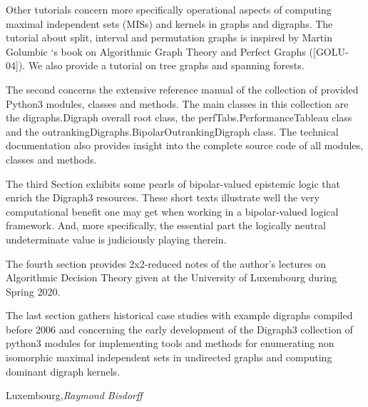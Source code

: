 Other tutorials concern more specifically operational aspects of computing maximal independent sets (MISs) and kernels in graphs and digraphs. The tutorial about split, interval and permutation graphs is inspired by Martin Golumbic ‘s book on Algorithmic Graph Theory and Perfect Graphs ([GOLU-04]). We also provide a tutorial on tree graphs and spanning forests.

The second  concerns the extensive reference manual of the collection of provided Python3 modules, classes and methods. The main classes in this collection are the digraphs.Digraph overall root class, the perfTabs.PerformanceTableau class and the outrankingDigraphs.BipolarOutrankingDigraph class. The technical documentation also provides insight into the complete source code of all modules, classes and methods.

The third Section exhibits some pearls of bipolar-valued epistemic logic that enrich the Digraph3 resources. These short texts illustrate well the very computational benefit one may get when working in a bipolar-valued logical framework. And, more specifically, the essential part the logically neutral undeterminate value is judiciously playing therein.

The fourth section provides 2x2-reduced notes of the author’s lectures on Algorithmic Decision Theory given at the University of Luxembourg during Spring 2020.

The last section gathers historical case studies with example digraphs compiled before 2006 and concerning the early development of the Digraph3 collection of python3 modules for implementing tools and methods for enumerating non isomorphic maximal independent sets in undirected graphs and computing dominant digraph kernels.

\vspace{\baselineskip}
\begin{flushright}\noindent
Luxembourg,\hfill {\it Raymond Bisdorff}\\
\end{flushright}


